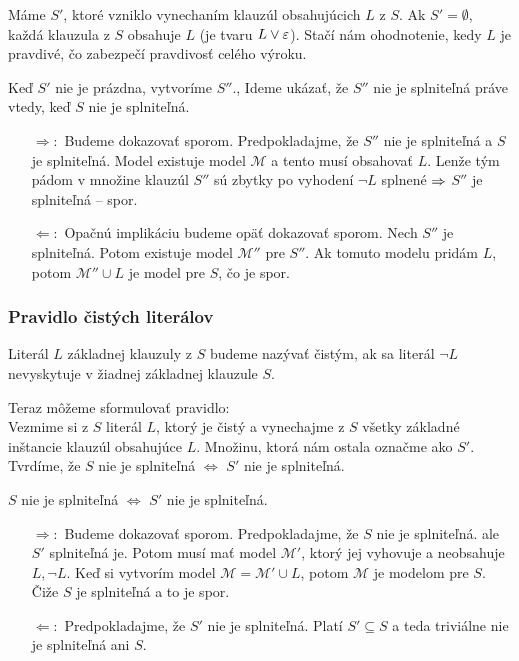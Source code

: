\begin{dokaz}
    Máme $S'$, ktoré vzniklo vynechaním klauzúl obsahujúcich $L$ z $S$.
    Ak $S'=\emptyset$, každá klauzula z $S$ obsahuje $L$ 
    (je tvaru $L \lor \varepsilon$).
    Stačí nám ohodnotenie, kedy $L$ je pravdivé, čo zabezpečí
    pravdivosť celého výroku. 

    Keď $S'$ nie je prázdna, vytvoríme $S''$.,
    Ideme ukázať, že $S''$ nie je splniteľná práve vtedy,
    keď $S$ nie je splniteľná.

    \begin{itemize}
    \item[$\Rightarrow:$] Budeme dokazovať sporom.
        Predpokladajme, že $S''$ nie je splniteľná a $S$ je splniteľná.
        Model existuje model $\mathcal{M}$ a tento musí obsahovať $L$.
        Lenže tým pádom v množine klauzúl $S''$ sú zbytky po vyhodení
        $\neg L$ splnené $\Rightarrow$ $S''$ je splniteľná -- spor.

    \item[$\Leftarrow:$] Opačnú implikáciu budeme opäť dokazovať sporom.
        Nech $S''$ je splniteľná. Potom existuje model
        $\mathcal{M}''$ pre $S''$. Ak tomuto modelu pridám $L$, potom
        $\mathcal{M}'' \cup L$ je model pre $S$, čo je spor.
    \end{itemize}
\end{dokaz}
\subsubsection{Pravidlo čistých literálov}

\begin{definicia}
    Literál $L$ základnej klauzuly z $S$ budeme nazývať čistým,
    ak sa literál $\neg L$ nevyskytuje v žiadnej základnej klauzule $S$.
\end{definicia}

\noindent
Teraz môžeme sformulovať pravidlo: \\
Vezmime si z $S$ literál $L$, ktorý je čistý
a vynechajme z $S$ všetky základné inštancie klauzúl obsahujúce $L$.
Množinu, ktorá nám ostala označme ako $S'$.
Tvrdíme, že $S$ nie je splniteľná $\iff$ $S'$ nie je splniteľná.


\begin{dokaz}
    $S$ nie je splniteľná $\iff$ $S'$ nie je splniteľná.
    \begin{itemize}
    \item[$\Rightarrow:$] Budeme dokazovať sporom.
        Predpokladajme, že $S$ nie je splniteľná.
        ale $S'$ splniteľná je. Potom musí mať
        model $\mathcal{M}'$, ktorý jej vyhovuje a neobsahuje
        $L, \neg L$.  Keď si vytvorím model $\mathcal{M}=\mathcal{M}'\cup L$,
        potom $\mathcal{M}$ je modelom pre $S$. Čiže
        $S$ je splniteľná a to je spor.

    \item[$\Leftarrow:$] Predpokladajme, že
        $S'$ nie je splniteľná. Platí $S' \subseteq S$ a teda
        triviálne nie je splniteľná ani $S$.
    \end{itemize}
\end{dokaz}

